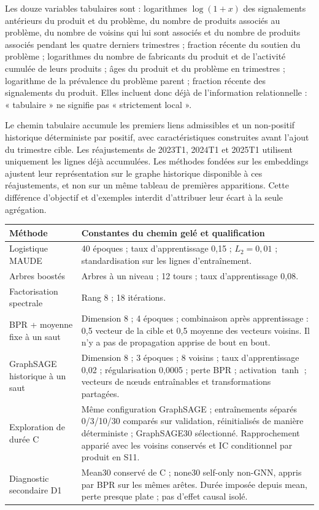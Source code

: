 \documentclass[10pt,a4paper]{article}
\begin{document}
Les douze variables tabulaires sont : logarithmes $\log(1+x)$ des signalements antérieurs du produit et du problème, du nombre de produits associés au problème, du nombre de voisins qui lui sont associés et du nombre de produits associés pendant les quatre derniers trimestres ; fraction récente du soutien du problème ; logarithmes du nombre de fabricants du produit et de l'activité cumulée de leurs produits ; âges du produit et du problème en trimestres ; logarithme de la prévalence du problème parent ; fraction récente des signalements du produit. Elles incluent donc déjà de l'information relationnelle : « tabulaire » ne signifie pas « strictement local ».

Le chemin tabulaire accumule les premiers liens admissibles et un non-positif historique déterministe par positif, avec caractéristiques construites avant l'ajout du trimestre cible. Les réajustements de 2023T1, 2024T1 et 2025T1 utilisent uniquement les lignes déjà accumulées. Les méthodes fondées sur les embeddings ajustent leur représentation sur le graphe historique disponible à ces réajustements, et non sur un même tableau de premières apparitions. Cette différence d'objectif et d'exemples interdit d'attribuer leur écart à la seule agrégation.

\begin{tabularx}{\linewidth}{@{}p{36mm}X@{}}
\toprule
Méthode & Constantes du chemin gelé et qualification\\
\midrule
Logistique MAUDE & 40 époques ; taux d'apprentissage 0,15 ; $L_2=0,01$ ; standardisation sur les lignes d'entraînement.\\
Arbres boostés & Arbres à un niveau ; 12 tours ; taux d'apprentissage 0,08.\\
Factorisation spectrale & Rang 8 ; 18 itérations.\\
BPR + moyenne fixe à un saut & Dimension 8 ; 4 époques ; combinaison après apprentissage : 0,5 vecteur de la cible et 0,5 moyenne des vecteurs voisins. Il n'y a pas de propagation apprise de bout en bout.\\
{\raggedright \mbox{GraphSAGE} historique à un saut\par} & Dimension 8 ; 3 époques ; 8 voisins ; taux d'apprentissage 0,02 ; régularisation 0,0005 ; perte BPR ; activation $\tanh$ ; vecteurs de nœuds entraînables et transformations partagées.\\
Exploration de durée C & Même configuration GraphSAGE ; entraînements séparés 0/3/10/30 comparés sur validation, réinitialisés de manière déterministe ; GraphSAGE30 sélectionné. Rapprochement apparié avec les voisins conservés et IC conditionnel par produit en S11.\\
Diagnostic secondaire D1 & Mean30 conservé de C ; none30 self-only non-GNN, appris par BPR sur les mêmes arêtes. Durée imposée depuis mean, perte presque plate ; pas d'effet causal isolé.\\
\bottomrule
\end{tabularx}
\end{document}
